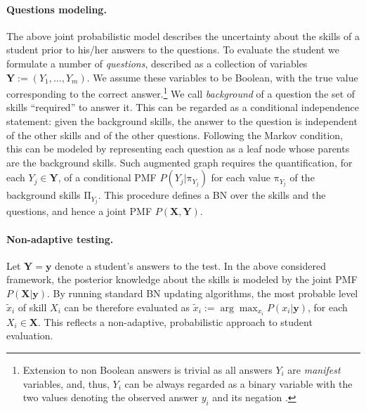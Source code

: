 \documentclass[runningheads]{llncs}
\begin{document}
	
	\paragraph{Questions modeling.} The above joint probabilistic model describes the 
	uncertainty about the skills of a student prior to his/her answers to the questions. To 
	evaluate the student we formulate a number of \emph{questions}, described as a 
	collection of variables $\bm{Y}:=(Y_1,\ldots,Y_m)$. We assume these variables to be 
	Boolean, with the true value corresponding to the correct answer.\footnote{Extension 
	to non Boolean answers is trivial as all answers $Y_i$ are \emph{manifest} variables, 
	and, thus, $Y_i$ can be always regarded as a binary variable with the two values 
	denoting the observed answer $y_i$ and its negation \cite{antonucci2009}.} We call 
	\emph{background} of a question the set of skills ``required'' to answer it. This can be 
	regarded as a conditional independence statement: given the background skills, the 
	answer to the question is independent of the other skills and of the other questions. 
	Following the Markov condition, this can be modeled by representing each question as 
	a leaf node whose parents are the background skills. Such augmented graph requires 
	the quantification, for each $Y_j\in\bm{Y}$, of a conditional PMF 
	$P(Y_j|\mathrm{\pi}_{Y_j})$ for each value $\mathrm{\pi}_{Y_j}$ of the background skills 
	$\mathrm{\Pi}_{Y_j}$. This procedure defines a BN over the skills and the questions, 
	and hence a joint PMF $P(\bm{X},\bm{Y})$.
	
	\paragraph{Non-adaptive testing.} Let $\bm{Y}=\bm{y}$ denote a student's answers 
	to the test. In the above considered framework, the posterior knowledge about the 
	skills is modeled by the joint PMF $P(\bm{X}|\bm{y})$. By running standard BN updating 
	algorithms, the most probable level $\tilde{x}_i$ of skill $X_i$ can be therefore 
	evaluated  as $\tilde{x}_i:= \arg\max_{x_i} P(x_i|\bm{y})$, for each $X_i\in\bm{X}$. This 
	reflects a non-adaptive, probabilistic approach to student evaluation. 
	
\end{document}
